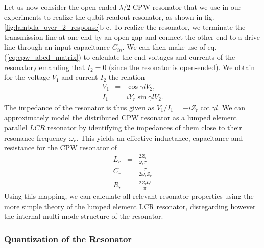 Let us now consider the open-ended $\lambda / 2$ CPW resonator that we use in our experiments to realize the qubit readout resonator, as shown in fig. \ref{fig:lambda_over_2_response}b-c. To realize the resonator, we terminate the transmission line at one end by an open gap and connect the other end to a drive line through an input capacitance $C_{in}$. We can then make use of eq. (\ref{eq:cpw_abcd_matrix}) to calculate the end voltages and currents of the resonator,demanding that $I_2=0$ (since the resonator is open-ended). We obtain for the voltage $V_1$ and current $I_2$ the relation
%
\begin{eqnarray}
V_1 & = & \cos{\gamma l} V_2, \\
I_1 & = & i Y_r \sin{\gamma l} V_2.
\end{eqnarray}
%
The impedance of the resonator is thus given as $V_1/I_1 = -i Z_r \cot{\gamma l}$. We can approximately model the distributed CPW resonator as a lumped element parallel $LCR$ resonator by identifying the impedances of them close to their resonance frequency $\omega_r$. This yields an effective inductance, capacitance and resistance for the CPW resonator of
%
\begin{eqnarray}
L_{r} & = & \frac{2 Z_r}{\omega_r \pi} \\
C_{r} & = & \frac{\pi}{2\omega_r Z_r} \\
R_{r} & = & \frac{2 Z_r Q}{\pi}
\end{eqnarray}
%
Using this mapping, we can calculate all relevant resonator properties using the more simple theory of the lumped element LCR resonator, disregarding however the internal multi-mode structure of the resonator.

\subsubsection{Quantization of the Resonator}

